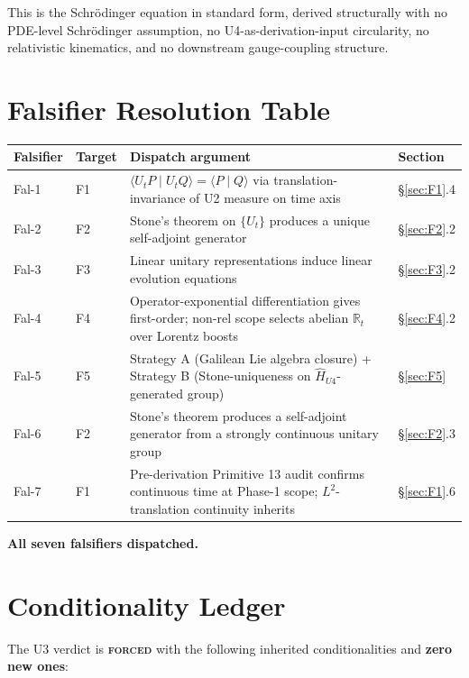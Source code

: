 \documentclass[11pt,a4paper]{article}
\begin{document}
This is the Schr\"odinger equation in standard form, derived structurally with no PDE-level Schr\"odinger assumption, no U4-as-derivation-input circularity, no relativistic kinematics, and no downstream gauge-coupling structure.

\section{Falsifier Resolution Table}\label{sec:falsifier-table}

\begin{center}
\begin{tabular}{p{2.0cm}p{1.0cm}p{8.5cm}p{1.8cm}}
\hline
Falsifier & Target & Dispatch argument & Section \\
\hline
Fal-1 & F1 & $\langle U_t P \mid U_t Q \rangle = \langle P \mid Q \rangle$ via translation-invariance of U2 measure on time axis & \S\ref{sec:F1}.4 \\
Fal-2 & F2 & Stone's theorem on $\{U_t\}$ produces a unique self-adjoint generator & \S\ref{sec:F2}.2 \\
Fal-3 & F3 & Linear unitary representations induce linear evolution equations & \S\ref{sec:F3}.2 \\
Fal-4 & F4 & Operator-exponential differentiation gives first-order; non-rel scope selects abelian $\mathbb{R}_t$ over Lorentz boosts & \S\ref{sec:F4}.2 \\
Fal-5 & F5 & Strategy A (Galilean Lie algebra closure) + Strategy B (Stone-uniqueness on $\hat{H}_{U4}$-generated group) & \S\ref{sec:F5} \\
Fal-6 & F2 & Stone's theorem produces a self-adjoint generator from a strongly continuous unitary group & \S\ref{sec:F2}.3 \\
Fal-7 & F1 & Pre-derivation Primitive 13 audit confirms continuous time at Phase-1 scope; $L^2$-translation continuity inherits & \S\ref{sec:F1}.6 \\
\hline
\end{tabular}
\end{center}

\textbf{All seven falsifiers dispatched.}

\section{Conditionality Ledger}\label{sec:conditionality}

The U3 verdict is \textbf{\textsc{forced}} with the following inherited conditionalities and \textbf{zero new ones}:
\end{document}
